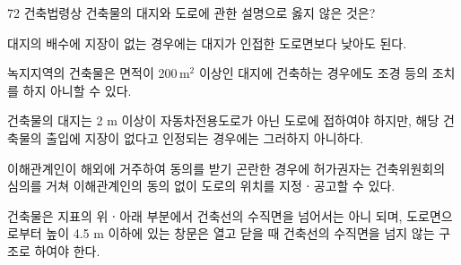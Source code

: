\begin{question}{72}
건축법령상 건축물의 대지와 도로에 관한 설명으로 옳지 않은 것은?
\begin{choices}
  \item 대지의 배수에 지장이 없는 경우에는 대지가 인접한 도로면보다 낮아도 된다.
  \item 녹지지역의 건축물은 면적이 200\,m$^2$ 이상인 대지에 건축하는 경우에도 조경 등의 조치를 하지 아니할 수 있다.
  \item 건축물의 대지는 2 m 이상이 자동차전용도로가 아닌 도로에 접하여야 하지만, 해당 건축물의 출입에 지장이 없다고 인정되는 경우에는 그러하지 아니하다.
  \item 이해관계인이 해외에 거주하여 동의를 받기 곤란한 경우에 허가권자는 건축위원회의 심의를 거쳐 이해관계인의 동의 없이 도로의 위치를 지정ㆍ공고할 수 있다.
  \item 건축물은 지표의 위ㆍ아래 부분에서 건축선의 수직면을 넘어서는 아니 되며, 도로면으로부터 높이 4.5 m 이하에 있는 창문은 열고 닫을 때 건축선의 수직면을 넘지 않는 구조로 하여야 한다.
\end{choices}
\end{question}
